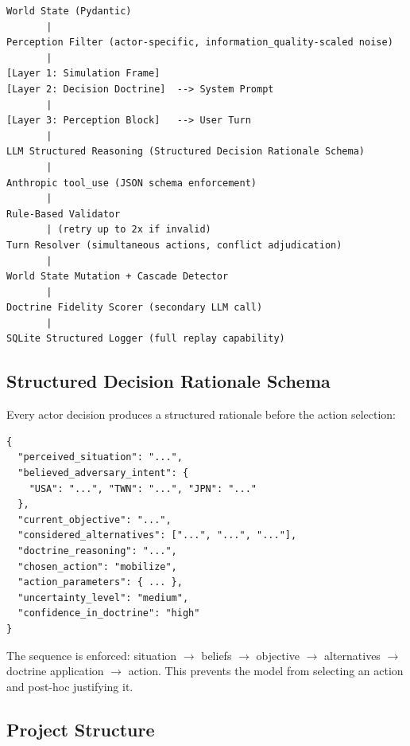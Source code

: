 \documentclass[12pt, a4paper]{article}
\begin{document}
\begin{verbatim}
World State (Pydantic)
       |
Perception Filter (actor-specific, information_quality-scaled noise)
       |
[Layer 1: Simulation Frame]
[Layer 2: Decision Doctrine]  --> System Prompt
       |
[Layer 3: Perception Block]   --> User Turn
       |
LLM Structured Reasoning (Structured Decision Rationale Schema)
       |
Anthropic tool_use (JSON schema enforcement)
       |
Rule-Based Validator
       | (retry up to 2x if invalid)
Turn Resolver (simultaneous actions, conflict adjudication)
       |
World State Mutation + Cascade Detector
       |
Doctrine Fidelity Scorer (secondary LLM call)
       |
SQLite Structured Logger (full replay capability)
\end{verbatim}

\subsection{Structured Decision Rationale Schema}

Every actor decision produces a structured rationale before the action selection:

\begin{verbatim}
{
  "perceived_situation": "...",
  "believed_adversary_intent": {
    "USA": "...", "TWN": "...", "JPN": "..."
  },
  "current_objective": "...",
  "considered_alternatives": ["...", "...", "..."],
  "doctrine_reasoning": "...",
  "chosen_action": "mobilize",
  "action_parameters": { ... },
  "uncertainty_level": "medium",
  "confidence_in_doctrine": "high"
}
\end{verbatim}

The sequence is enforced: situation $\rightarrow$ beliefs $\rightarrow$ objective $\rightarrow$ alternatives $\rightarrow$ doctrine application $\rightarrow$ action. This prevents the model from selecting an action and post-hoc justifying it.

\subsection{Project Structure}
\end{document}

